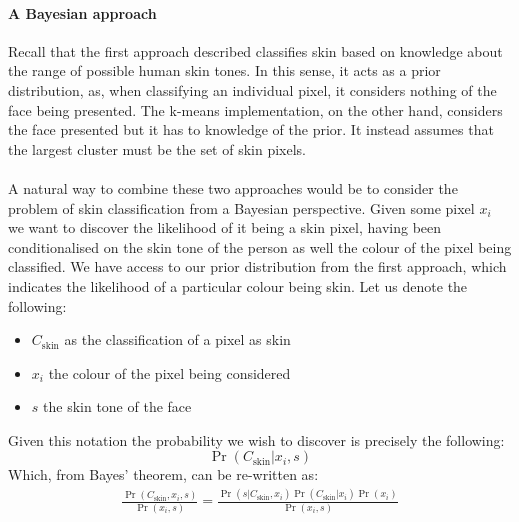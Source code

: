 \paragraph{A Bayesian approach}
Recall that the first approach described classifies skin based on knowledge about the range of possible human skin tones. 
In this sense, it acts as a prior distribution, as, when classifying an individual pixel, it considers nothing of the face being presented.
The k-means implementation, on the other hand, considers the face presented but it has to knowledge of the prior. It instead assumes that the largest cluster must be the set of skin pixels.
\\ \\ 
A natural way to combine these two approaches would be to consider the problem of skin classification from a Bayesian perspective. Given some pixel $x_i$ we want to discover the likelihood of it being a skin pixel, having been conditionalised on the skin tone of the person as well the colour of the pixel being classified. 
We have access to our prior distribution from the first approach, which indicates the likelihood of a particular colour being skin.
Let us denote the following: 
\begin{itemize}
   \item $C_{\mathrm{skin}}$ as the classification of a pixel as skin
   \item $x_i$ the colour of the pixel being considered
   \item $s$ the skin tone of the face
\end{itemize} 
Given this notation the probability we wish to discover is precisely the following:
\begin{equation*}
   \Pr(C_{\mathrm{skin}}| x_i, s) 
\end{equation*}
Which, from Bayes' theorem, can be re-written as: 
\begin{align*}
   \frac{\Pr(C_\mathrm{skin}, x_i, s)}{\Pr(x_i, s)} = \frac{\Pr(s|C_\mathrm{skin}, x_i)\Pr(C_\mathrm{skin}|x_i)\Pr(x_i)}{\Pr(x_i,s)}
\end{align*}
